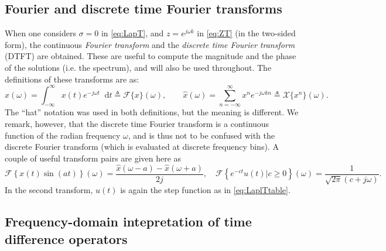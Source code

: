 \documentclass[11pt,twoside,a4paper,english]{book}
\newcommand{\dif}{\mathop{}\!\mathrm{d}}
\newcommand{\virg}[1]{``#1''}
\begin{document}
\subsection{Fourier and discrete time Fourier transforms}
When one considers $\sigma=0$ in \eqref{eq:LapT}, and $z = e^{j\omega k}$ in \eqref{eq:ZT} (in the two-sided form), the continuous \emph{Fourier transform} and the \emph{discrete time Fourier transform} (DTFT) are obtained. These are useful to compute the magnitude and the phase of the solutions (i.e. the spectrum), and will also be used throughout. The definitions of these transforms are as: 
\begin{equation}
    \hat x(\omega) = \int_{-\infty}^{\infty} x(t) e^{-j\omega t} \dif t \triangleq \mathcal{F}\{x\}(\omega),\qquad \hat x(\omega) = \sum_{n = -\infty}^{\infty} x^n e^{-j\omega k n} \triangleq \mathcal{X}\{x^n \}(\omega).
\end{equation}
The \virg{hat} notation was used in both definitions, but the meaning is different. We remark, however, that the discrete time Fourier transform is a continuous function of the radian frequency $\omega$, and is thus not to be confused with the discrete Fourier transform (which is evaluated at discrete frequency bins). A couple of useful transform pairs are given here as
\begin{equation}\label{eq:FouTtable}
    \mathcal{F}\left\{x(t)\sin(at)\right\}(\omega) = \frac{\hat x(\omega-a)-\hat x(\omega+a)}{2j}, \quad \mathcal{F}\left\{e^{-ct}u(t)| c \geq 0\right\}(\omega) = \frac{1}{\sqrt{2\pi}(c+j\omega)}.
\end{equation}
In the second transform, $u(t)$ is again the step function as in \eqref{eq:LaplTtable}. 

\subsection{Frequency-domain intepretation of time difference operators}\label{sec:FDtransformations}
\end{document}
